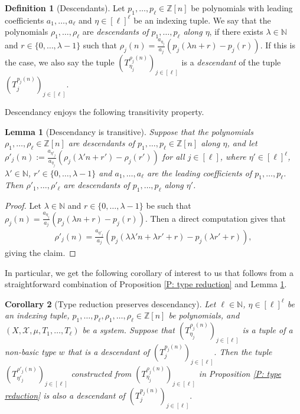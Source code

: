 \documentclass[11pt]{amsart}
\newtheorem{lemma}{Lemma}[section]
\newtheorem{corollary}[lemma]{Corollary}
\theoremstyle{definition}
\newtheorem*{definition}{Definition}
\newcommand{\N}{{\mathbb N}}
\newcommand{\Z}{{\mathbb Z}}
\newcommand{\CX}{{\mathcal X}}
\newcommand{\brac}[1]{\mathopen{}\left( #1 \mathclose{}\right)}
\begin{document}
\begin{definition}[Descendants]
    Let $p_1, \ldots, p_\ell\in\Z[n]$ be polynomials with leading coefficients $a_1, \ldots, a_\ell$ and $\eta\in[\ell]^\ell$ be an indexing tuple. We say that the polynomials $\rho_1, \ldots, \rho_\ell$ are \textit{descendants of $p_1, \ldots, p_\ell$ along $\eta$}, if there exists $\lambda\in\N$ and $r\in\{0, \ldots, \lambda-1\}$ such that $\rho_j(n) = \frac{a_{\eta_j}}{a_j}(p_j(\lambda n+r) - p_j(r))$. If this is the case, we also say the tuple $\brac{T_{\eta_j}^{\rho_j(n)}}_{j\in[\ell]}$ is a \textit{descendant} of the tuple $\brac{T_j^{p_j(n)}}_{j\in[\ell]}$.
\end{definition}
 Descendancy enjoys the following transitivity property.
\begin{lemma}[Descendancy is transitive]\label{L: descendancy transitive}
Suppose that the polynomials  $\rho_1, \ldots, \rho_\ell\in \Z[n]$ are descendants of $p_1, \ldots, p_\ell\in \Z[n]$ along $\eta$, and let $\rho'_j(n) := \frac{a_{\eta'_j}}{a_{\eta_j}}(\rho_j(\lambda' n + r') - \rho_j(r'))$ for all $j\in[\ell]$, where $\eta'\in[\ell]^\ell$, $\lambda'\in\N$, $r'\in\{0, \ldots, \lambda-1\}$ and $a_1, \ldots, a_\ell$ are the leading coefficients of $p_1, \ldots, p_\ell$. Then $\rho'_1, \ldots, \rho'_\ell$ are descendants of $p_1, \ldots, p_\ell$ along $\eta'$.
\end{lemma}
\begin{proof}
Let $\lambda\in\N$ and $r\in\{0, \ldots, \lambda-1\}$ be such that $\rho_j(n) = \frac{a_{\eta_j}}{a_j}(p_j(\lambda n+r) - p_j(r))$. Then a direct computation gives that
\begin{align*}
    \rho'_j(n) = \frac{a_{\eta'_j}}{a_j}(p_j(\lambda\lambda' n + \lambda r' + r) - p_j(\lambda r' + r)),
\end{align*}
giving the claim.
\end{proof}
In particular, we get the following corollary of interest to us that follows from a straightforward combination of Proposition \ref{P: type reduction} and Lemma \ref{L: descendancy transitive}.
\begin{corollary}[Type reduction preserves descendancy]\label{C: ping reduction transitive}
    Let $\ell\in\N$, $\eta\in[\ell]^\ell$ be an indexing tuple, $p_1, \ldots, p_\ell, \rho_1, \ldots, \rho_\ell\in\Z[n]$ be polynomials, and $(X, \CX, \mu, T_1, \ldots, T_\ell)$ be a system. Suppose that $\brac{T_{\eta_j}^{\rho_j(n)}}_{j\in[\ell]}$ is a tuple of a non-basic type $w$ that is a descendant of $\brac{T_j^{p_j(n)}}_{j\in[\ell]}.$ Then the tuple $\brac{T_{\eta'_j}^{\rho'_j(n)}}_{j\in[\ell]}$ constructed from $\brac{T_{\eta_j}^{\rho_j(n)}}_{j\in[\ell]}$ in Proposition \ref{P: type reduction} is also a descendant of $\brac{T_j^{p_j(n)}}_{j\in[\ell]}.$
\end{corollary}
\end{document}
